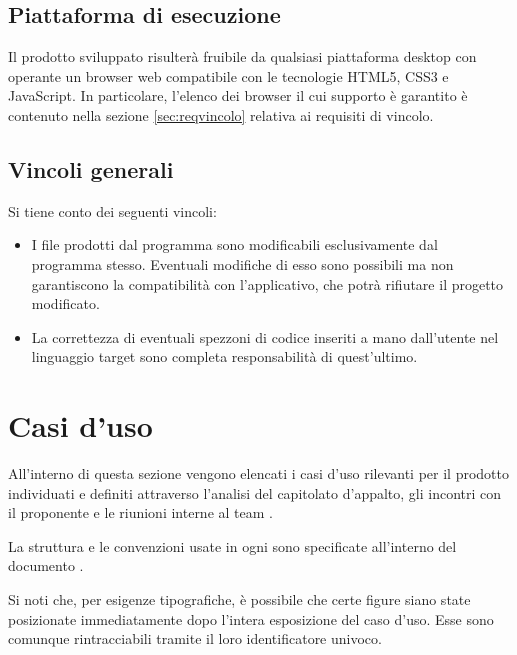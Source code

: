 \subsection{Piattaforma di esecuzione}
Il prodotto sviluppato risulterà fruibile da qualsiasi piattaforma desktop con operante un browser web compatibile con le tecnologie HTML5, CSS3 e JavaScript. In particolare, l'elenco dei browser il cui supporto è garantito è contenuto nella sezione \ref{sec:reqvincolo} relativa ai requisiti di vincolo.

\subsection{Vincoli generali}
Si tiene conto dei seguenti vincoli:
\begin{itemize}
	\item I file prodotti dal programma sono modificabili esclusivamente dal programma stesso. Eventuali modifiche di esso sono possibili ma non garantiscono la compatibilità con l'applicativo, che potrà rifiutare il progetto modificato.
	\item La correttezza di eventuali spezzoni di codice inseriti a mano dall'utente nel linguaggio target sono completa responsabilità di quest'ultimo.
\end{itemize}






\section{Casi d'uso}
All'interno di questa sezione vengono elencati i casi d'uso rilevanti per il prodotto \proj{} individuati e definiti attraverso l'analisi del capitolato d'appalto, gli incontri con il proponente e le riunioni interne al team \hx{}.

La struttura e le convenzioni usate in ogni  sono specificate all'interno del documento \NdP.

Si noti che, per esigenze tipografiche, è possibile che certe figure siano state posizionate immediatamente dopo l'intera esposizione del caso d'uso. Esse sono comunque rintracciabili tramite il loro identificatore univoco.

